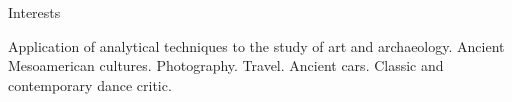 \begin{rubric}{Interests}

\entry*[] Application of analytical techniques to the study of art and archaeology. Ancient Mesoamerican cultures. Photography. Travel. Ancient cars. Classic and contemporary dance critic.


\end{rubric}